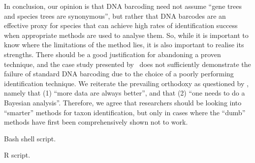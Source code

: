\documentclass[12pt]{article}
\begin{document}
In conclusion, our opinion is that DNA barcoding need not assume ``gene trees and species trees are synonymous'', but rather that DNA barcodes are an effective proxy for species that can achieve high rates of identification success when appropriate methods are used to analyse them. So, while it is important to know where the limitations of the method lies, it is also important to realise its strengths. There should be a good justification for abandoning a proven technique, and the case study presented by \citeauthor{Dowton2014}\ does not sufficiently demonstrate the failure of standard DNA barcoding due to the choice of a poorly performing identification technique.  We reiterate the prevailing orthodoxy as questioned by \citep{Karl2012}, namely that (1) ``more data are always better'', and that (2) ``one needs to do a Bayesian analysis''. Therefore, we agree that researchers should be looking into ``smarter'' methods for taxon identification, but only in cases where the ``dumb'' methods have first been comprehensively shown not to work.




\clearpage
\newpage

\begin{Supplementary Data}
\caption{Bash shell script. }
\label{suppl:bash}
\end{Supplementary Data}

\begin{Supplementary Data}
\caption{R script. }
\label{suppl:R}
\end{Supplementary Data}
\end{document}
